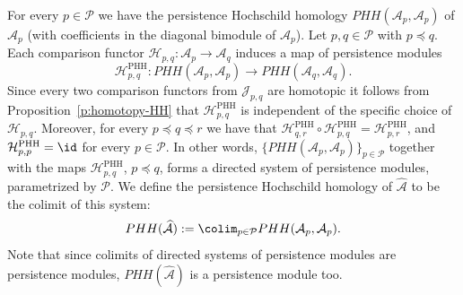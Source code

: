 For every $p \in \mathcal{P}$ we have the persistence Hochschild
homology $PHH(\mathcal{A}_p, \mathcal{A}_p)$ of $\mathcal{A}_p$ (with
coefficients in the diagonal bimodule of $\mathcal{A}_p$). Let
$p, q \in \mathcal{P}$ with $p \preceq q$. Each comparison functor
$\mathcal{H}_{p,q} : \mathcal{A}_p \longrightarrow \mathcal{A}_q$
induces a map of persistence modules
$$\mathcal{H}^{\text{PHH}}_{p,q}: PHH(\mathcal{A}_p, \mathcal{A}_p)
\longrightarrow PHH(\mathcal{A}_q, \mathcal{A}_q).$$ Since every two
comparison functors from $\mathcal{J}_{p,q}$ are homotopic it follows
from Proposition~\ref{p:homotopy-HH} that
$\mathcal{H}^{\text{PHH}}_{p,q}$ is independent of the specific choice
of $\mathcal{H}_{p,q}$. Moreover, for every $p \preceq q \preceq r$ we
have that
$\mathcal{H}^{\text{PHH}}_{q,r} \circ \mathcal{H}^{\text{PHH}}_{p,q} =
\mathcal{H}^{\text{PHH}}_{p,r}$, and
$\mathcal{H}^{\text{PHH}}_{p,p} = \id$ for every $p \in \mathcal{P}$.
In other words,
$\{PHH(\mathcal{A}_p, \mathcal{A}_p)\}_{p \in \mathcal{P}}$ together
with the maps $\mathcal{H}^{\text{PHH}}_{p,q}$, $p \preceq q$, forms a
directed system of persistence modules, parametrized by $\mathcal{P}$.
We define the persistence Hochschild homology of
$\widehat{\mathcal{A}}$ to be the colimit of this system:
\begin{equation} \label{eq:HH-colim} PHH(\widehat{\mathcal{A}}) :=
  \colim_{p \in \mathcal{P}} PHH(\mathcal{A}_p, \mathcal{A}_p).
\end{equation}
Note that since colimits of directed systems of persistence modules
are persistence modules, $PHH(\widehat{\mathcal{A}})$ is a persistence
module too.

